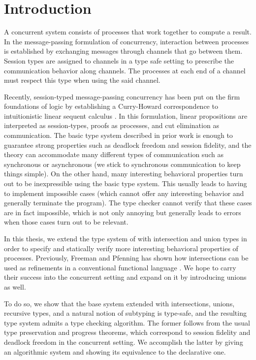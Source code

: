 
\chapter{Introduction}

A concurrent system consists of processes that work together to compute a result. In the message-passing formulation of concurrency, interaction between processes is established by exchanging messages through channels that go between them. Session types are assigned to channels in a type safe setting to prescribe the communication behavior along channels. The processes at each end of a channel must respect this type when using the said channel.

Recently, session-typed message-passing concurrency has been put on the firm foundations of logic by establishing a Curry-Howard correspondence to intuitionistic linear sequent calculus \cite{CairesP10, PfenningG15, Honda93}. In this formulation, linear propositions are interpreted as session-types, proofs as processes, and cut elimination as communication. The basic type system described in prior work is enough to guarantee strong properties such as deadlock freedom and session fidelity, and the theory can accommodate many different types of communication such as synchronous or asynchronous (we stick to synchronous communication to keep things simple). On the other hand, many interesting behavioral properties turn out to be inexpressible using the basic type system. This usually leads to having to implement impossible cases (which cannot offer any interesting behavior and generally terminate the program). The type checker cannot verify that these cases are in fact impossible, which is not only annoying but generally leads to errors when those cases turn out to be relevant.

In this thesis, we extend the type system of \cite{PfenningG15} with intersection and union types in order to specify and statically verify more interesting behavioral properties of processes. Previously, Freeman and Pfenning has shown how intersections can be used as refinements in a conventional functional language \cite{FreemanP91}. We hope to carry their success into the concurrent setting and expand on it by introducing unions as well.

To do so, we show that the base system extended with intersections, unions, recursive types, and a natural notion of subtyping is type-safe, and the resulting type system admits a type checking algorithm. The former follows from the usual type preservation and progress theorems, which correspond to session fidelity and deadlock freedom in the concurrent setting. We accomplish the latter by giving an algorithmic system and showing its equivalence to the declarative one.


